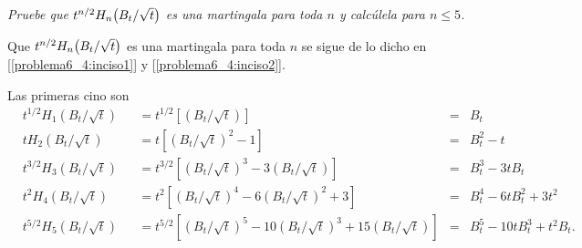 \emph{
    Pruebe que $t^{n/2}H_n\!\left( B_t/\sqrt{t}\right) $ es una martingala para 
    toda $n$ y calc\'ulela para $n\leq 5$.\pn
}

\afterstatement\pn

Que $t^{n/2}H_n\!\left( B_t/\sqrt{t}\right) $ es una martingala para toda $n$ se 
sigue de lo dicho en [\ref{problema6_4:inciso1}] y [\ref{problema6_4:inciso2}].\pn

Las primeras cino son
\scriptsize
\begin{align}
        &t^{1/2} H_1(B_t/\sqrt{t})   &&=  t^{1/2}\left[(B_t/\sqrt{t})\right] &=& B_t                                                                        \\
        &t H_2(B_t/\sqrt{t})         &&=  t\left[(B_t/\sqrt{t})^2 - 1\right] &=& B_t^2 - t                                                                  \\
        &t^{3/2} H_3(B_t/\sqrt{t})   &&=  t^{3/2}\left[(B_t/\sqrt{t})^3 - 3(B_t/\sqrt{t})\right] &=& B_t^3 - 3t B_t                                         \\
        &t^{2} H_4(B_t/\sqrt{t})     &&=  t^{2}\left[(B_t/\sqrt{t})^4 - 6(B_t/\sqrt{t})^2 + 3\right] &=& B_t^4 - 6t B_t^2 + 3t^2                            \\
        &t^{5/2} H_5(B_t/\sqrt{t})   &&=  t^{5/2}\left[(B_t/\sqrt{t})^5 - 10(B_t/\sqrt{t})^3 + 15(B_t/\sqrt{t})\right] &=& B_t^5 - 10t B_t^3 + t^2 B_t.     \\
\end{align}
\normalsize